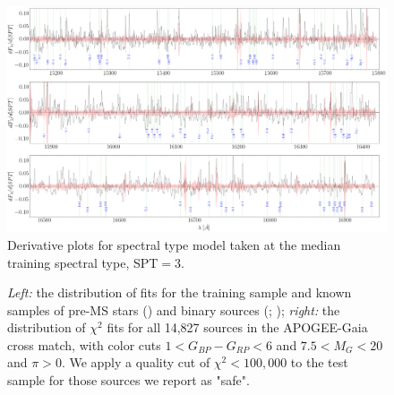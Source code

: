 \documentclass[preprint]{aastex62}
\begin{document}
\begin{figure}[ht]
\begin{center}
\includegraphics[width=16cm]{figures/derivative_jackknife_spt.png}
\end{center}
\caption{Derivative plots for spectral type model taken at the median training spectral type, SPT$=3$.} \label{fig:west_derivative}
\end{figure}


\begin{figure}[ht]
\caption{\textit{Left:} the distribution of fits for the training sample and known samples of pre-MS stars (\citealt{Cottaar:2014}) and binary sources (\citealt{ElBadry:2018}; \citealt{Skinner:2018}); \textit{right:} the distribution of $\chi^2$ fits for all 14,827 sources in the APOGEE-Gaia cross match, with color cuts $1<G_{BP}-G_{RP}<6$ and $7.5<M_{G}<20$ and $\pi>0$. We apply a quality cut of $\chi^2 < 100,000$ to the test sample for those sources we report as "safe". \label{fig:chi_dist}}
\end{figure}
\end{document}
